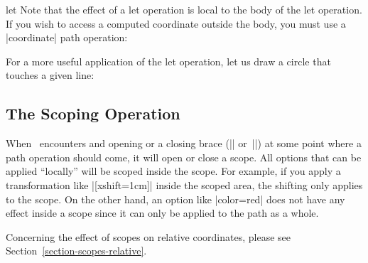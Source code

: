 \begin{pathoperation}{let}{
    }
  Note that the effect of a let operation is local to the body of the
  let operation. If you wish to access a computed coordinate outside
  the body, you must use a |coordinate| path operation:
\begin{codeexample}[]
\end{codeexample}

  For a more useful application of the let operation, let us draw a
  circle that touches a given line:
\begin{codeexample}[]
\end{codeexample}
\end{pathoperation}


\subsection{The Scoping Operation}

When \tikzname\ encounters and opening or a closing brace (|{| or~|}|) at
some point where a path operation should come, it will open or close a
scope. All options that can be applied ``locally'' will be scoped
inside the scope. For example, if you apply a transformation like
|[xshift=1cm]| inside the scoped area, the shifting only applies to
the scope. On the other hand, an option like |color=red| does not have
any effect inside a scope since it can only be applied to the path as
a whole.

Concerning the effect of scopes on relative coordinates,
please see Section~\ref{section-scopes-relative}.


